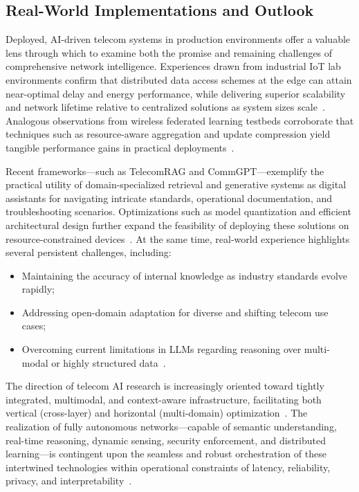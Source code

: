 \documentclass[sigconf]{acmart}
\begin{document}
\subsection{Real-World Implementations and Outlook}

Deployed, AI-driven telecom systems in production environments offer a valuable lens through which to examine both the promise and remaining challenges of comprehensive network intelligence. Experiences drawn from industrial IoT lab environments confirm that distributed data access schemes at the edge can attain near-optimal delay and energy performance, while delivering superior scalability and network lifetime relative to centralized solutions as system sizes scale~\cite{ref14}. Analogous observations from wireless federated learning testbeds corroborate that techniques such as resource-aware aggregation and update compression yield tangible performance gains in practical deployments~\cite{ref12}.

Recent frameworks—such as TelecomRAG and CommGPT—exemplify the practical utility of domain-specialized retrieval and generative systems as digital assistants for navigating intricate standards, operational documentation, and troubleshooting scenarios. Optimizations such as model quantization and efficient architectural design further expand the feasibility of deploying these solutions on resource-constrained devices~\cite{ref11,ref22,ref29}. At the same time, real-world experience highlights several persistent challenges, including:
\begin{itemize}
  \item Maintaining the accuracy of internal knowledge as industry standards evolve rapidly;
  \item Addressing open-domain adaptation for diverse and shifting telecom use cases;
  \item Overcoming current limitations in LLMs regarding reasoning over multi-modal or highly structured data~\cite{ref21,ref29}.
\end{itemize}

The direction of telecom AI research is increasingly oriented toward tightly integrated, multimodal, and context-aware infrastructure, facilitating both vertical (cross-layer) and horizontal (multi-domain) optimization~\cite{ref24,ref25}. The realization of fully autonomous networks—capable of semantic understanding, real-time reasoning, dynamic sensing, security enforcement, and distributed learning—is contingent upon the seamless and robust orchestration of these intertwined technologies within operational constraints of latency, reliability, privacy, and interpretability~\cite{ref14,ref19,ref20,ref24,ref26}.
\end{document}
